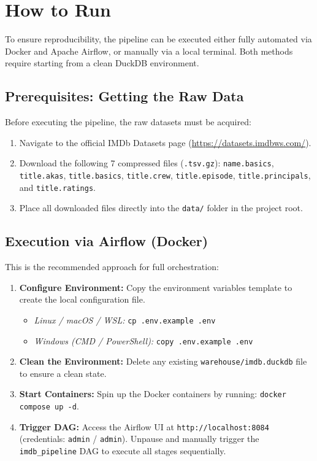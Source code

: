 \documentclass[runningheads]{llncs}
\begin{document}
\section{How to Run}
To ensure reproducibility, the pipeline can be executed either fully automated via Docker and Apache Airflow, or manually via a local terminal. Both methods require starting from a clean DuckDB environment.

\subsection{Prerequisites: Getting the Raw Data}
Before executing the pipeline, the raw datasets must be acquired:
\begin{enumerate}
    \item Navigate to the official IMDb Datasets page (\url{https://datasets.imdbws.com/}).
    \item Download the following 7 compressed files (\texttt{.tsv.gz}): \texttt{name.basics}, \texttt{title.akas}, \texttt{title.basics}, \texttt{title.crew}, \texttt{title.episode}, \texttt{title.principals}, and \texttt{title.ratings}.
    \item Place all downloaded files directly into the \texttt{data/} folder in the project root.
\end{enumerate}

\subsection{Execution via Airflow (Docker)}
This is the recommended approach for full orchestration:
\begin{enumerate}
    \item \textbf{Configure Environment:} Copy the environment variables template to create the local configuration file.
    \begin{itemize}
        \item \textit{Linux / macOS / WSL:} \texttt{cp .env.example .env}
        \item \textit{Windows (CMD / PowerShell):} \texttt{copy .env.example .env}
    \end{itemize}
    \item \textbf{Clean the Environment:} Delete any existing \texttt{warehouse/imdb.duckdb} file to ensure a clean state.
    \item \textbf{Start Containers:} Spin up the Docker containers by running: \texttt{docker compose up -d}.
    \item \textbf{Trigger DAG:} Access the Airflow UI at \texttt{http://localhost:8084} (credentials: \texttt{admin} / \texttt{admin}). Unpause and manually trigger the \texttt{imdb\_pipeline} DAG to execute all stages sequentially.
\end{enumerate}
\end{document}
